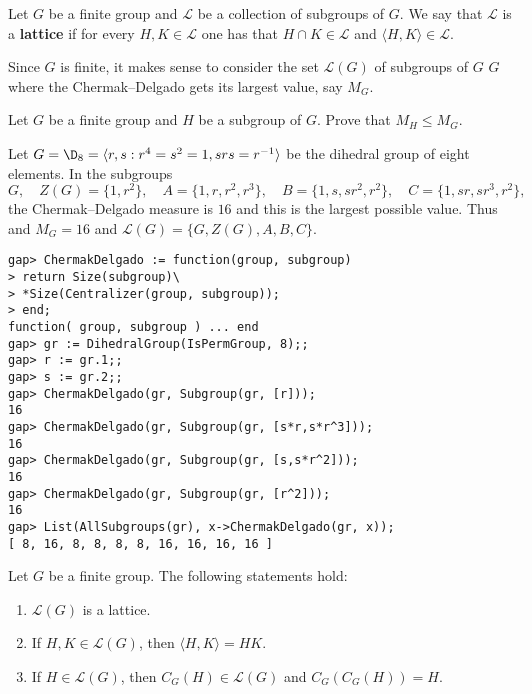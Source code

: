 \begin{definition}
Let $G$ be a finite group and $\mathcal{L}$ be a collection of subgroups of $G$. We say that $\mathcal{L}$ is a \textbf{lattice} if for every $H,K\in\mathcal{L}$ one has that
$H\cap K\in\mathcal{L}$ and $\langle H,K\rangle\in\mathcal{L}$. 
\end{definition}

Since $G$ is finite, it makes sense to consider the set $\mathcal{L}(G)$ of 
subgroups of $G$ $G$ where the Chermak--Delgado gets its largest value,
say $M_G$. 

\begin{exercise}
	\label{xca:M_S}
	Let $G$ be a finite group and $H$ be a subgroup of $G$. Prove that 
	$M_H\leq M_G$.
\end{exercise}


\begin{example}
	\label{exa:D8_CD}
    Let $G=\D_8=\langle r,s:r^4=s^2=1,srs=r^{-1}\rangle$ be the dihedral group
    of eight elements. In the subgroups 
    \[
		G,
		\quad
		Z(G)=\{1,r^2\},\quad
		A=\{1,r,r^2,r^3\},\quad
		B=\{1, s,sr^2,r^2\},\quad
		C=\{1,sr,sr^3,r^2\},
	\]
	the Chermak--Delgado measure is $16$ and this is the largest possible value. Thus and $M_G=16$ and $\mathcal{L}(G)=\{G,Z(G),A,B,C\}$. 
	\begin{lstlisting}
gap> ChermakDelgado := function(group, subgroup)
> return Size(subgroup)\
> *Size(Centralizer(group, subgroup));
> end;
function( group, subgroup ) ... end
gap> gr := DihedralGroup(IsPermGroup, 8);;
gap> r := gr.1;;
gap> s := gr.2;;
gap> ChermakDelgado(gr, Subgroup(gr, [r]));
16
gap> ChermakDelgado(gr, Subgroup(gr, [s*r,s*r^3]));
16
gap> ChermakDelgado(gr, Subgroup(gr, [s,s*r^2]));
16
gap> ChermakDelgado(gr, Subgroup(gr, [r^2]));
16
gap> List(AllSubgroups(gr), x->ChermakDelgado(gr, x));
[ 8, 16, 8, 8, 8, 8, 16, 16, 16, 16 ]
	\end{lstlisting}
\end{example}

\begin{theorem}
	Let $G$ be a finite group. The following statements hold: 
	\begin{enumerate}
		\item $\mathcal{L}(G)$ is a lattice. 
		\item If $H,K\in\mathcal{L}(G)$, then $\langle H,K\rangle=HK$.
		\item If $H\in\mathcal{L}(G)$, then $C_G(H)\in\mathcal{L}(G)$ and $C_G(C_G(H))=H$.
	\end{enumerate}
	\label{thm:lattice}
\end{theorem}

